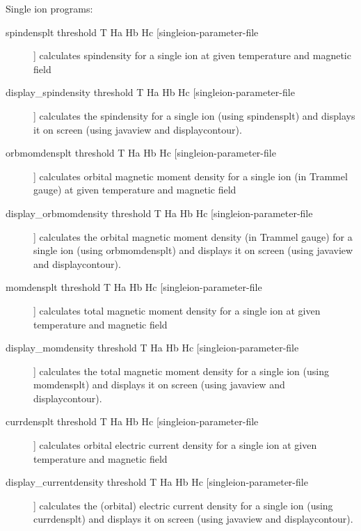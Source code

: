 Single ion programs:
\begin{description}
\item [spindensplt threshold T Ha Hb Hc [singleion-parameter-file]]
 calculates spindensity for a single ion at given temperature and magnetic field
\item [display\_spindensity  threshold T Ha Hb Hc [singleion-parameter-file]]
 calculates the spindensity for a single ion (using {\prg spindensplt})
 and displays it on screen (using {\prg javaview} and {\prg displaycontour}).
\item [orbmomdensplt threshold T Ha Hb Hc [singleion-parameter-file]]
 calculates orbital magnetic moment density for a single ion (in Trammel gauge) at given temperature and magnetic field
\item [display\_orbmomdensity  threshold T Ha Hb Hc [singleion-parameter-file]]
 calculates the orbital magnetic moment density (in Trammel gauge) for a single ion (using {\prg orbmomdensplt})
 and displays it on screen (using {\prg javaview} and {\prg displaycontour}).
\item [momdensplt threshold T Ha Hb Hc [singleion-parameter-file]]
 calculates total magnetic moment density for a single ion at given temperature and magnetic field
\item [display\_momdensity  threshold T Ha Hb Hc [singleion-parameter-file]]
 calculates the total magnetic moment density for a single ion (using {\prg momdensplt})
 and displays it on screen (using {\prg javaview} and {\prg displaycontour}).
\item [currdensplt threshold T Ha Hb Hc [singleion-parameter-file]]
 calculates orbital electric current density for a single ion at given temperature and magnetic field
\item [display\_currentdensity  threshold T Ha Hb Hc [singleion-parameter-file]]
 calculates the (orbital) electric current density for a single ion (using {\prg currdensplt})
 and displays it on screen (using {\prg javaview} and {\prg displaycontour}).


\end{description}
